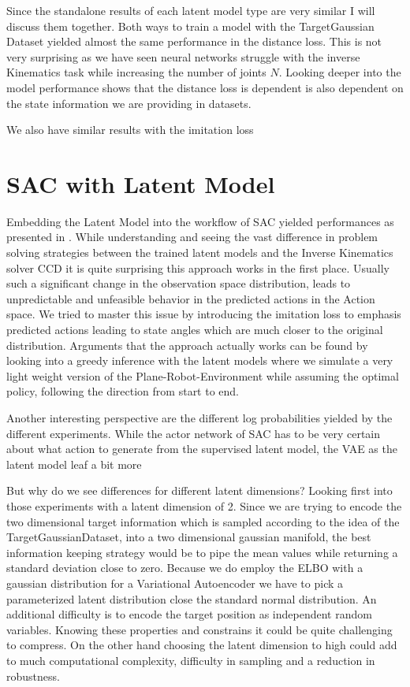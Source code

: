 Since the standalone results of each latent model type are very similar I will discuss them together.
Both ways to train a model with the TargetGaussian Dataset yielded almost the same performance in the distance loss. This is not very surprising as we have seen neural networks struggle with the inverse Kinematics task while increasing the number of joints $N$. Looking deeper into the model performance shows that the distance loss is dependent is also dependent on the state information we are providing in datasets.    

We also have similar results with the imitation loss


\section{SAC with Latent Model}

Embedding the Latent Model into the workflow of SAC yielded performances as presented in . While understanding and seeing the vast difference in problem solving strategies between the trained latent models and the Inverse Kinematics solver CCD it is quite surprising this approach works in the first place. Usually such a significant change in the observation space distribution, leads to unpredictable and unfeasible behavior in the predicted actions in the Action space. We tried to master this issue by introducing the imitation loss to emphasis predicted actions leading to state angles which are much closer to the original distribution.  Arguments that the approach actually works can be found by looking into a greedy inference with the latent models where we simulate a very light weight version of the Plane-Robot-Environment while assuming the optimal policy, following the direction from start to end.

Another interesting perspective are the different log probabilities yielded by the different experiments. While the actor network of SAC has to be very certain about what action to generate from the supervised latent model, the VAE as the latent model leaf a bit more    

But why do we see differences for different latent dimensions? Looking first into those experiments with a latent dimension of 2. Since we are trying to encode the two dimensional target information which is sampled according to the idea of the TargetGaussianDataset, into a two dimensional gaussian manifold, the best information keeping strategy would be to pipe the mean values while returning a standard deviation close to zero. Because we do employ the ELBO with a gaussian distribution for a Variational Autoencoder we have to pick a parameterized latent distribution close the standard normal distribution. An additional difficulty is to encode the target position as independent random variables. Knowing these properties and constrains it could be quite challenging to compress. On the other hand choosing the latent dimension to high could add to much computational complexity, difficulty in sampling and a reduction in robustness.

